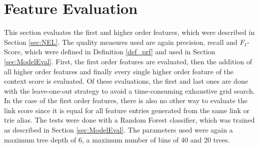 \section{Feature Evaluation}
\label{sec:FeatureEval}
This section evaluates the first and higher order features, which were described in Section \ref{sec:NEL}. The quality measures used are again precision, recall and $F_1$-Score, which were defined in Definition \ref{def_prf} and used in Section \ref{sec:ModelEval}. First, the first order features are evaluated, then the addition of all higher order features and finally every single higher order feature of the context score is evaluated. Of these evaluations, the first and last ones are done with the leave-one-out strategy to avoid a time-consuming exhaustive grid search. In the case of the first order features, there is also no other way to evaluate the link score since it is equal for all feature entries generated from the same link or trie alias. The tests were done with a Random Forest classifier, which was trained as described in Section \ref{sec:ModelEval}. The parameters used were again a maximum tree depth of 6, a maximum number of bins of 40 and 20 trees.\par

